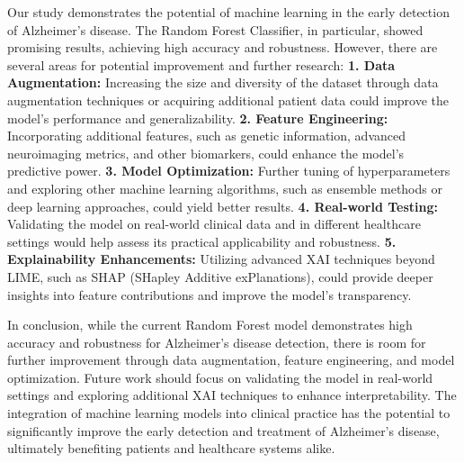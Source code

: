 \documentclass[a4paper,12pt]{report}
\begin{document}
Our study demonstrates the potential of machine learning in the early detection of Alzheimer's disease. The Random Forest Classifier, in particular, showed promising results, achieving high accuracy and robustness. However, there are several areas for potential improvement and further research:
{}
\newline\textbf{1. Data Augmentation:} Increasing the size and diversity of the dataset through data augmentation techniques or acquiring additional patient data could improve the model's performance and generalizability.
\newline\textbf{2. Feature Engineering:} Incorporating additional features, such as genetic information, advanced neuroimaging metrics, and other biomarkers, could enhance the model's predictive power.
\newline\textbf{3. Model Optimization:} Further tuning of hyperparameters and exploring other machine learning algorithms, such as ensemble methods or deep learning approaches, could yield better results.
\newline\textbf{4. Real-world Testing:} Validating the model on real-world clinical data and in different healthcare settings would help assess its practical applicability and robustness.
\newline\textbf{5. Explainability Enhancements:} Utilizing advanced XAI techniques beyond LIME, such as SHAP (SHapley Additive exPlanations), could provide deeper insights into feature contributions and improve the model's transparency.

In conclusion, while the current Random Forest model demonstrates high accuracy and robustness for Alzheimer's disease detection, there is room for further improvement through data augmentation, feature engineering, and model optimization. Future work should focus on validating the model in real-world settings and exploring additional XAI techniques to enhance interpretability. The integration of machine learning models into clinical practice has the potential to significantly improve the early detection and treatment of Alzheimer's disease, ultimately benefiting patients and healthcare systems alike.
\end{document}
